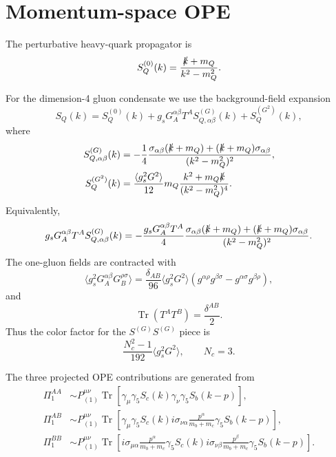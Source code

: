 \documentclass[11pt]{article}
\begin{document}
\section{Momentum-space OPE}

The perturbative heavy-quark propagator is
\begin{equation}
  S_Q^{(0)}(k)
  =
  \frac{\slashed{k}+m_Q}{k^2-m_Q^2}.
\end{equation}

For the dimension-4 gluon condensate we use the background-field expansion
\begin{equation}
  S_Q(k)
  =
  S_Q^{(0)}(k)
  +
  g_sG_A^{\alpha\beta}T^A S_{Q,\alpha\beta}^{(G)}(k)
  +
  S_Q^{(G^2)}(k),
\end{equation}
where
\begin{align}
  S_{Q,\alpha\beta}^{(G)}(k)
  &=
  -\frac{1}{4}
  \frac{
    \sigma_{\alpha\beta}(\slashed{k}+m_Q)
    +
    (\slashed{k}+m_Q)\sigma_{\alpha\beta}
  }
  {(k^2-m_Q^2)^2},
  \\
  S_Q^{(G^2)}(k)
  &=
  \frac{\langle g_s^2G^2\rangle}{12}
  m_Q
  \frac{k^2+m_Q\slashed{k}}
  {(k^2-m_Q^2)^4}.
\end{align}
Equivalently,
\begin{equation}
  g_sG_A^{\alpha\beta}T^A S_{Q,\alpha\beta}^{(G)}(k)
  =
  -\frac{g_sG_A^{\alpha\beta}T^A}{4}
  \frac{
    \sigma_{\alpha\beta}(\slashed{k}+m_Q)
    +
    (\slashed{k}+m_Q)\sigma_{\alpha\beta}
  }
  {(k^2-m_Q^2)^2}.
\end{equation}
The one-gluon fields are contracted with
\begin{equation}
  \langle g_s^2G_A^{\alpha\beta}G_B^{\rho\sigma}\rangle
  =
  \frac{\delta_{AB}}{96}
  \langle g_s^2G^2\rangle
  \left(
    g^{\alpha\rho}g^{\beta\sigma}
    -
    g^{\alpha\sigma}g^{\beta\rho}
  \right),
\end{equation}
and
\begin{equation}
  \operatorname{Tr}(T^AT^B)=\frac{\delta^{AB}}{2}.
\end{equation}
Thus the color factor for the $S^{(G)}S^{(G)}$ piece is
\begin{equation}
  \frac{N_c^2-1}{192}\langle g_s^2G^2\rangle,
  \qquad N_c=3.
\end{equation}

The three projected OPE contributions are generated from
\begin{align}
  \Pi^{AA}_1 &\sim
  P^{\mu\nu}_{(1)}
  \operatorname{Tr}
  \left[
    \gamma_\mu\gamma_5
    S_c(k)
    \gamma_\nu\gamma_5
    S_b(k-p)
  \right],\\
  \Pi^{AB}_1 &\sim
  P^{\mu\nu}_{(1)}
  \operatorname{Tr}
  \left[
    \gamma_\mu\gamma_5
    S_c(k)
    i\sigma_{\nu\alpha}
    \frac{p^\alpha}{m_b+m_c}
    \gamma_5
    S_b(k-p)
  \right],\\
  \Pi^{BB}_1 &\sim
  P^{\mu\nu}_{(1)}
  \operatorname{Tr}
  \left[
    i\sigma_{\mu\alpha}
    \frac{p^\alpha}{m_b+m_c}
    \gamma_5
    S_c(k)
    i\sigma_{\nu\beta}
    \frac{p^\beta}{m_b+m_c}
    \gamma_5
    S_b(k-p)
  \right].
\end{align}
\end{document}
